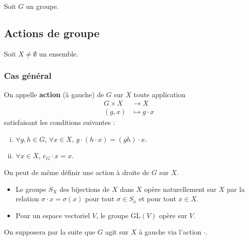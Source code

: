 


	
	Soit $G$ un groupe.
	
	\subsection{Actions de groupe}
	
	Soit $X \neq \emptyset$ un ensemble.
	
	\subsubsection{Cas général}
	

	\begin{definition}
		On appelle \textbf{action} (à gauche) de $G$ sur $X$ toute application
		\[
		\begin{array}{cl}
			G \times X &\rightarrow X \\
			(g, x) &\mapsto g \cdot x
		\end{array}
		\]
		satisfaisant les conditions suivantes :
		\begin{enumerate}[(i)]
			\item $\forall g, h \in G$, $\forall x \in X$, $g \cdot (h \cdot x) = (gh) \cdot x$.
			\item $\forall x \in X$, $e_G \cdot x = x$.
		\end{enumerate}
	\end{definition}

	\begin{remark}
		On peut de même définir une action à droite de $G$ sur $X$.
	\end{remark}

	\begin{example}
		\begin{itemize}
			\item Le groupe $S_X$ des bijections de $X$ dans $X$ opère naturellement sur $X$ par la relation $\sigma \cdot x = \sigma(x)$ pour tout $\sigma \in S_x$ et pour tout $x \in X$.
			\item Pour un espace vectoriel $V$, le groupe $\mathrm{GL}(V)$ opère sur $V$.
		\end{itemize}
	\end{example}

	On supposera par la suite que $G$ agit sur $X$ à gauche via l'action $\cdot$.

